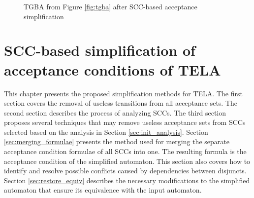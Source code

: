\documentclass[
  digital, %
  twoside, %
  table,   %
  lof,     %
  lot,     %
]{fithesis3}
\begin{document}
\begin{figure}[h]
    \begin{center}
    \caption{TGBA from Figure \ref{fig:tgba} after SCC-based acceptance simplification}
    \label{fig:simpl_tgba}
  \end{center}
\end{figure}


\chapter{SCC-based simplification of acceptance conditions of TELA}
\label{chap:simpl_tela}
This chapter presents the proposed simplification methods for TELA. The first section covers the removal of useless transitions from all acceptance sets. The second section describes the process of analyzing SCCs. The third section proposes several techniques that may remove useless acceptance sets from SCCs selected based on the analysis in Section \ref{sec:init_analysis}. Section \ref{sec:merging_formulae} presents the method used for merging the separate acceptance condition formulae of all SCCs into one. The resulting formula is the acceptance condition of the simplified automaton. This section also covers how to identify and resolve possible conflicts caused by dependencies between disjuncts. Section \ref{sec:restore_equiv} describes the necessary modifications to the simplified automaton that ensure its equivalence with the input automaton. 
\end{document}
